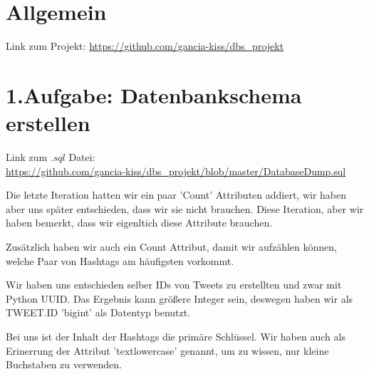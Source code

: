 \usepackage{graphicx}
\usepackage{listings} %

\newcommand{\dozent}{Prof.  Dr.  Agnès Voisard, Nicolas Lehmann}					%
\newcommand{\tutor}{Hoffman Christian}						%
\newcommand{\tutoriumNo}{ 3, Gruppe 22}				%
\newcommand{\projectNo}{2.Iteration}									%
\newcommand{\veranstaltung}{Datenbank Systeme}	%
\newcommand{\semester}{SoeSe 2017}						%
\newcommand{\studenten}{Ingrid Tchilibou, Emil Milanov, Boyan Hristov}			%






\section*{Allgemein}
Link zum Projekt: \url{https://github.com/gancia-kiss/dbs_projekt}


\section*{1.Aufgabe: Datenbankschema erstellen}
Link zum $.sql$ Datei: \\ 
\url{https://github.com/gancia-kiss/dbs_projekt/blob/master/DatabaseDump.sql}

Die letzte Iteration hatten wir ein paar 'Count' Attributen addiert, wir haben aber uns später entschieden, dass wir sie nicht brauchen. Diese Iteration, aber wir haben bemerkt, dass wir eigenltich diese Attribute brauchen.

Zusätzlich haben wir auch ein Count Attribut, damit wir aufzählen können, welche Paar von Hashtags am häufigsten vorkommt. 

Wir haben uns entschieden selber IDs von Tweets zu erstellten und zwar mit Python UUID. Das Ergebnis kann größere Integer sein, deswegen haben wir als TWEET.ID 'bigint' als Datentyp benutzt.

Bei uns ist der Inhalt der Hashtags die primäre Schlüssel. Wir haben auch als Erinerrung der Attribut 'textlowercase' genannt, um zu wissen, nur kleine Buchstaben zu verwenden.

